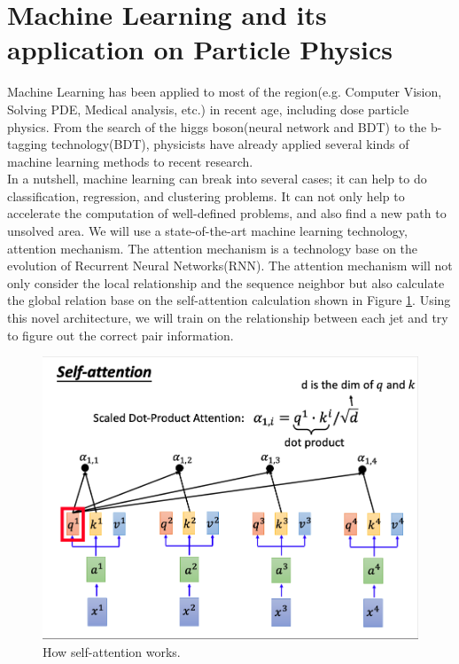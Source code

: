 \section{Machine Learning and its application on Particle Physics}

Machine Learning has been applied to most of the region(e.g. Computer Vision, Solving PDE, Medical analysis, etc.) in recent age, including dose particle physics. From the search of the higgs boson(neural network and BDT) to the b-tagging technology(BDT\cite{Paganini:2017dpd}), physicists have already applied several kinds of machine learning methods to recent research.
\\
In a nutshell, machine learning can break into several cases; it can help to do classification, regression, and clustering problems. It can not only help to accelerate the computation of well-defined problems, and also find a new path to unsolved area. We will use a state-of-the-art machine learning technology, attention mechanism.\cite{A.Vaswani:2017} The attention mechanism is a technology base on the evolution of Recurrent Neural Networks(RNN).\cite{A.Vaswani:2017} The attention mechanism will not only consider the local relationship and the sequence neighbor but also calculate the global relation base on the self-attention calculation shown in Figure \ref{fig:attention}. Using this novel architecture, we will train on the relationship between each jet and try to figure out the correct pair information.
\\
\begin{figure}[h]
	\centering
	\includegraphics[width=0.8\linewidth]{Figures/attention.png}
	\caption{How self-attention works.\cite{HY.Lee:2019}}
	\label{fig:attention}
\end{figure}

